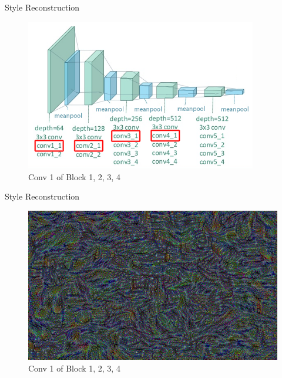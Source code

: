 \documentclass{beamer}
\begin{document}
\begin{frame}{Style Reconstruction}
\begin{figure}[ht]
\centering
\caption{Conv 1 of Block 1, 2, 3, 4}
\includegraphics[width=0.9\textwidth]{img/vgg19/style/block4_conv1}
\end{figure}
\end{frame}
\begin{frame}{Style Reconstruction}
\begin{figure}[ht]
\centering
\caption{Conv 1 of Block 1, 2, 3, 4}
\includegraphics[width=\textwidth]{img/style/block4_conv1.png}
\end{figure}
\end{frame}
\end{document}
